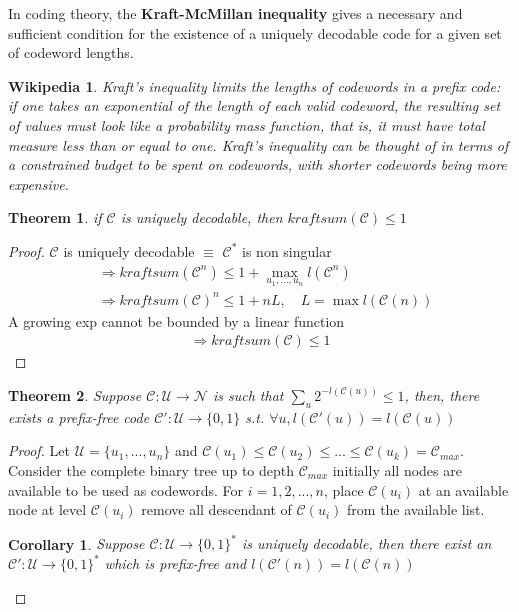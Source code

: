 \documentclass{article}
\newtheorem{theorem}{Theorem}[section]
\newtheorem{corollary}{Corollary}[theorem]
\newtheorem*{wikipedia}{Wikipedia}
\theoremstyle{definition} %
\def\U{\mathcal{U}}
\def\N{\mathcal{N}}
\def\C{\mathscr{C}}
\begin{document}
In coding theory, the \textbf{Kraft-McMillan inequality} gives a necessary and sufficient condition for the existence of a uniquely decodable code for a given set of codeword lengths.

\begin{wikipedia}
  Kraft's inequality limits the lengths of codewords in a prefix code: if one takes an exponential of the length of each valid codeword, the resulting set of values must look like a probability mass function, that is, it must have total measure less than or equal to one. Kraft's inequality can be thought of in terms of a constrained budget to be spent on codewords, with shorter codewords being more expensive.
\end{wikipedia}

\begin{theorem}
  if $\C$ is uniquely decodable, then $kraftsum(\C) \leq 1$
\end{theorem}

\begin{proof}
  $\C$ is uniquely decodable $\equiv$ $\C^*$ is non singular
  \begin{align*}
    &\Rightarrow kraftsum(\C^n) \leq 1 + \max _{u_1, ..., u_n} l(\C^n) \\
    &\Rightarrow kraftsum(\C)^n \leq 1 + n L, \quad L = \max l(\C(n))
  \end{align*}
  A growing exp cannot be bounded by a linear function
  \begin{align*}
    \Rightarrow kraftsum(\C) \leq 1
  \end{align*}
\end{proof}

\begin{theorem}
  Suppose $\C : \U \rightarrow \N$ is such that $\sum_u 2^{-l(\C(u))} \leq 1$, then, there exists a prefix-free code $\C': \U \rightarrow \{0, 1\}$ s.t. $\forall u, l(\C'(u)) = l(\C(u))$
\end{theorem}

\begin{proof}
  Let $\U = \{u_1, ..., u_n\}$ and $\C(u_1) \leq \C(u_2) \leq ... \leq \C(u_k) = \C_{max}$.
  Consider the complete binary tree up to depth $\C_{max}$ initially all nodes are available to be used as codewords.
  For $i = 1, 2, ..., n$, place $\C(u_i)$ at an available node at level $\C(u_i)$ remove all descendant of $\C(u_i)$ from the available list.

  \begin{corollary}
    Suppose $\C: \U \rightarrow \{0, 1\}^*$ is uniquely decodable, then there exist an $\C': \U \rightarrow \{0, 1\}^*$ which is prefix-free and $l(\C'(n)) = l(\C(n))$
  \end{corollary}
\end{proof}
\end{document}
